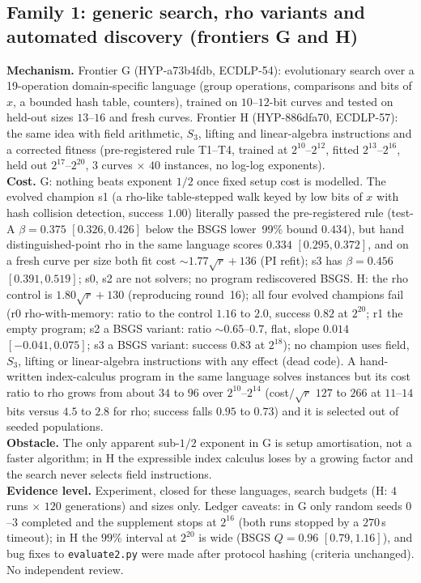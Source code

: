\documentclass[11pt,a4paper]{article}
\theoremstyle{remark}
\begin{document}
\subsection{Family 1: generic search, rho variants and automated discovery (frontiers G and H)}
\textbf{Mechanism.} Frontier G (\mbox{HYP-a73b4fdb}, ECDLP-54): evolutionary search over a 19-operation domain-specific language (group operations, comparisons and bits of $x$, a bounded hash table, counters), trained on $10$--$12$-bit curves and tested on held-out sizes $13$--$16$ and fresh curves. Frontier H (\mbox{HYP-886dfa70}, ECDLP-57): the same idea with field arithmetic, $S_3$, lifting and linear-algebra instructions and a corrected fitness (pre-registered rule T1--T4, trained at $2^{10}$--$2^{12}$, fitted $2^{13}$--$2^{16}$, held out $2^{17}$--$2^{20}$, $3$ curves $\times$ $40$ instances, no log-log exponents).\\
\textbf{Cost.} G: nothing beats exponent $1/2$ once fixed setup cost is modelled. The evolved champion s1 (a rho-like table-stepped walk keyed by low bits of $x$ with hash collision detection, success $1.00$) literally passed the pre-registered rule (test-A $\beta=0.375$ $[0.326,0.426]$ below the BSGS lower~99\% bound $0.434$), but hand distinguished-point rho in the same language scores $0.334$ $[0.295,0.372]$, and on a fresh curve per size both fit cost $\sim 1.77\sqrt r+136$ (PI refit); s3 has $\beta=0.456$ $[0.391,0.519]$; s0, s2 are not solvers; no program rediscovered BSGS. H: the rho control is $1.80\sqrt r+130$ (reproducing round~16); all four evolved champions fail (r0 rho-with-memory: ratio to the control $1.16$ to $2.0$, success $0.82$ at $2^{20}$; r1 the empty program; s2 a BSGS variant: ratio $\sim0.65$--$0.7$, flat, slope $0.014$ $[-0.041,0.075]$; s3 a BSGS variant: success $0.83$ at $2^{18}$); no champion uses field, $S_3$, lifting or linear-algebra instructions with any effect (dead code). A hand-written index-calculus program in the same language solves instances but its cost ratio to rho grows from about $34$ to $96$ over $2^{10}$--$2^{14}$ (cost$/\sqrt r$ $127$ to $266$ at $11$--$14$ bits versus $4.5$ to $2.8$ for rho; success falls $0.95$ to $0.73$) and it is selected out of seeded populations.\\
\textbf{Obstacle.} The only apparent sub-$1/2$ exponent in G is setup amortisation, not a faster algorithm; in H the expressible index calculus loses by a growing factor and the search never selects field instructions.\\
\textbf{Evidence level.} Experiment, closed for these languages, search budgets (H: $4$ runs $\times$ $120$ generations) and sizes only. Ledger caveats: in G only random seeds $0$--$3$ completed and the supplement stops at $2^{16}$ (both runs stopped by a $270$\,s timeout); in H the $99\%$ interval at $2^{20}$ is wide (BSGS $Q=0.96$ $[0.79,1.16]$), and bug fixes to \texttt{evaluate2.py} were made after protocol hashing (criteria unchanged). No independent review.
\end{document}

